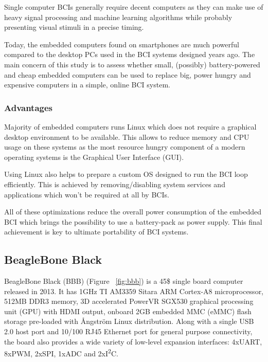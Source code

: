 \documentclass[12pt]{article}
\newcommand\mysubsection[1]{\subsection{#1}}
\newcommand\mysubsubsection[1]{\subsubsection{#1}}
\numberwithin{equation}{section}
\numberwithin{figure}{section}
\numberwithin{table}{section}
\begin{document}
\par{
Single computer BCIs generally require decent computers as they can make use of heavy signal processing
and machine learning algorithms while probably presenting visual stimuli in a precise timing.
}

\par{
Today, the embedded computers found on smartphones are much powerful compared to the desktop PCs
used in the BCI systems designed years ago. The main concern of this study is to assess whether small,
(possibly) battery-powered and cheap embedded computers can be used to replace big, power hungry and
expensive computers in a simple, online BCI system.
}

\mysubsubsection{Advantages}\label{seq:embeddedcomputer_advantages}

\par{
Majority of embedded computers runs Linux which does not require a graphical desktop environment
to be available. This allows to reduce memory and CPU usage on these systems as the most resource
hungry component of a modern operating systems is the Graphical User Interface (GUI).
}

\par{
Using Linux also helps to prepare a custom OS designed to run the BCI loop efficiently.
This is achieved by removing/disabling system services and applications which won't be required at all by BCIs.
}

\par{
All of these optimizations reduce the overall power consumption of the embedded BCI which brings
the possibility to use a battery-pack as power supply. This final achievement is key to ultimate
portability of BCI systems.
}

\mysubsection{BeagleBone Black}\label{seq:embeddedcomputer_bbb}

\par{
BeagleBone Black (BBB) (Figure ~\ref{fig:bbb}) is a 45\$ single board computer released in 2013. It has 1GHz TI AM3359 Sitara ARM Cortex-A8 microprocessor,
512MB DDR3 memory, 3D accelerated PowerVR SGX530 graphical processing unit (GPU) with HDMI output, onboard 2GB embedded MMC (eMMC)
flash storage pre-loaded with Ångström Linux distribution. Along with a single USB 2.0 host port and 10/100 RJ45 Ethernet port for
general purpose connectivity, the board also provides a wide variety of low-level expansion interfaces:
4xUART, 8xPWM, 2xSPI, 1xADC and 2xI\textsuperscript{2}C.
}
\end{document}
